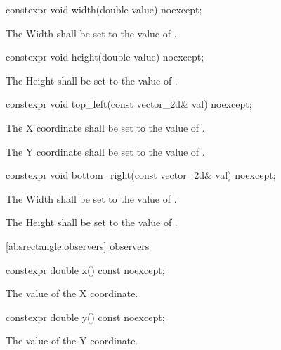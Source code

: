 \begin{itemdecl}
constexpr void width(double value) noexcept;
\end{itemdecl}
\begin{itemdescr}
\pnum
\effects
The Width shall be set to the value of .
\end{itemdescr}

\begin{itemdecl}
constexpr void height(double value) noexcept;
\end{itemdecl}
\begin{itemdescr}
\pnum
\effects
The Height shall be set to the value of .
\end{itemdescr}

\begin{itemdecl}
constexpr void top_left(const vector_2d& val) noexcept;
\end{itemdecl}
\begin{itemdescr}
\pnum
\effects
The X coordinate shall be set to the value of .

\effects
The Y coordinate shall be set to the value of .
\end{itemdescr}

\begin{itemdecl}
constexpr void bottom_right(const vector_2d& val) noexcept;
\end{itemdecl}
\begin{itemdescr}
\pnum
\effects
The Width shall be set to the value of .

\pnum
The Height shall be set to the value of .
\end{itemdescr}

 [absrectangle.observers]{ observers}

\begin{itemdecl}
constexpr double x() const noexcept;
\end{itemdecl}
\begin{itemdescr}
\pnum
\returns
The value of the X coordinate.
\end{itemdescr}

\begin{itemdecl}
constexpr double y() const noexcept;
\end{itemdecl}
\begin{itemdescr}
\pnum
\returns
The value of the Y coordinate.
\end{itemdescr}

